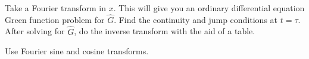 {\begin{Hint}
\end{Hint}





\begin{Hint}
\end{Hint}



\begin{Hint}
  Take a Fourier transform in $x$.  This will give you an ordinary differential 
  equation Green function problem for $\hat{G}$.  Find the continuity and 
  jump conditions at $t = \tau$.  After solving for $\hat{G}$, do the 
  inverse transform with the aid of a table.
\end{Hint}



\begin{Hint}
\end{Hint}






\begin{Hint}
\end{Hint}







\begin{Hint}
\end{Hint}






\begin{Hint}
\end{Hint}





\begin{Hint}
\end{Hint}



\begin{Hint}
  Use Fourier sine and cosine transforms.
\end{Hint}





}
